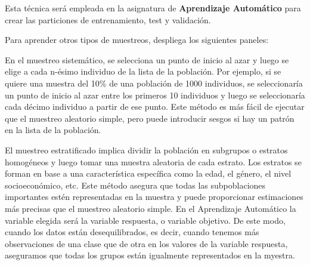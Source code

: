 \documentclass[
  letterpaper,
  DIV=11,
  numbers=noendperiod]{scrreprt}
\begin{document}
Esta técnica será empleada en la asignatura de \textbf{Aprendizaje
Automático} para crear las particiones de entrenamiento, test y
validación.

Para aprender otros tipos de muestreos, despliega los siguientes
paneles:

\begin{tcolorbox}[enhanced jigsaw, arc=.35mm, breakable, coltitle=black, left=2mm, opacityback=0, bottomtitle=1mm, colbacktitle=quarto-callout-note-color!10!white, title=\textcolor{quarto-callout-note-color}{\faInfo}\hspace{0.5em}{Muestreo Sistemático}, titlerule=0mm, colback=white, colframe=quarto-callout-note-color-frame, bottomrule=.15mm, rightrule=.15mm, opacitybacktitle=0.6, toptitle=1mm, toprule=.15mm, leftrule=.75mm]

En el muestreo sistemático, se selecciona un punto de inicio al azar y
luego se elige a cada n-ésimo individuo de la lista de la población. Por
ejemplo, si se quiere una muestra del 10\% de una población de 1000
individuos, se seleccionaría un punto de inicio al azar entre los
primeros 10 individuos y luego se seleccionaría cada décimo individuo a
partir de ese punto. Este método es más fácil de ejecutar que el
muestreo aleatorio simple, pero puede introducir sesgos si hay un patrón
en la lista de la población.

\end{tcolorbox}

\begin{tcolorbox}[enhanced jigsaw, arc=.35mm, breakable, coltitle=black, left=2mm, opacityback=0, bottomtitle=1mm, colbacktitle=quarto-callout-note-color!10!white, title=\textcolor{quarto-callout-note-color}{\faInfo}\hspace{0.5em}{Muestreo Estratificado}, titlerule=0mm, colback=white, colframe=quarto-callout-note-color-frame, bottomrule=.15mm, rightrule=.15mm, opacitybacktitle=0.6, toptitle=1mm, toprule=.15mm, leftrule=.75mm]

El muestreo estratificado implica dividir la población en subgrupos o
estratos homogéneos y luego tomar una muestra aleatoria de cada estrato.
Los estratos se forman en base a una característica específica como la
edad, el género, el nivel socioeconómico, etc. Este método asegura que
todas las subpoblaciones importantes estén representadas en la muestra y
puede proporcionar estimaciones más precisas que el muestreo aleatorio
simple. En el Aprendizaje Automático la variable elegida será la
variable respuesta, o variable objetivo. De este modo, cuando los datos
están desequilibrados, es decir, cuando tenemos más observaciones de una
clase que de otra en los valores de la variable respuesta, aseguramos
que todas los grupos están igualmente representados en la myestra.

\end{tcolorbox}
\end{document}
